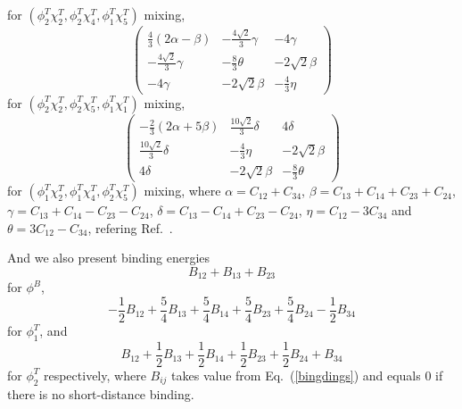 \documentclass[prd,twocolumn,floatfix,nofootinbib]{revtex4}
\begin{document}
for $(\phi_{2}^{T}\chi_{2}^{T},\phi_{2}^{T}\chi_{4}^{T},\phi_{1}^{T}\chi_{5}^{T})$ mixing,
\begin{equation}\label{221mixing254}
    \begin{pmatrix}
        \frac{4}{3}(2\alpha-\beta)  & -\frac{4\sqrt{2}}{3}\gamma    & -4\gamma \\
        -\frac{4\sqrt{2}}{3}\gamma  & -\frac{8}{3}\theta            & -2\sqrt{2}\beta \\
        -4\gamma                    & -2\sqrt{2}\beta               & -\frac{4}{3}\eta
    \end{pmatrix}
\end{equation}
for $(\phi_{2}^{T}\chi_{2}^{T},\phi_{2}^{T}\chi_{5}^{T},\phi_{1}^{T}\chi_{1}^{T})$ mixing,
\begin{equation}\label{112mixing245}
    \begin{pmatrix}
        -\frac{2}{3}(2\alpha+5\beta)    & \frac{10\sqrt{2}}{3}\delta    & 4\delta \\
        \frac{10\sqrt{2}}{3}\delta      & -\frac{4}{3}\eta              & -2\sqrt{2}\beta \\
        4\delta                         & -2\sqrt{2}\beta               & -\frac{8}{3}\theta
    \end{pmatrix}
\end{equation}
for $(\phi_{1}^{T}\chi_{2}^{T},\phi_{1}^{T}\chi_{4}^{T},\phi_{2}^{T}\chi_{5}^{T})$ mixing,
where $\alpha=C_{12}+C_{34}$, $\beta=C_{13}+C_{14}+C_{23}+C_{24}$, $\gamma=C_{13}+C_{14}-C_{23}-C_{24}$, $\delta=C_{13}-C_{14}+C_{23}-C_{24}$, 
$\eta=C_{12}-3C_{34}$ and $\theta=3C_{12}-C_{34}$, refering Ref.~\cite{Luo:2017eub}.

And we also present binding energies
\begin{equation}
    B_{12}+B_{13}+B_{23}
\end{equation}
for $\phi^{B}$,
\begin{equation}
    -\frac{1}{2}B_{12}+\frac{5}{4}B_{13}+\frac{5}{4}B_{14}+\frac{5}{4}B_{23}+\frac{5}{4}B_{24}-\frac{1}{2}B_{34}
\end{equation}
for $\phi_{1}^{T}$, and
\begin{equation}
    B_{12}+\frac{1}{2}B_{13}+\frac{1}{2}B_{14}+\frac{1}{2}B_{23}+\frac{1}{2}B_{24}+B_{34}
\end{equation}
for $\phi_{2}^{T}$ respectively, where $B_{ij}$ takes value from Eq.~(\ref{bingdings}) and equals 0 if there is no short-distance binding.
\end{document}
